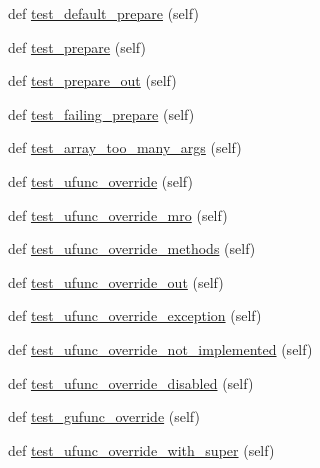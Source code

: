 \begin{DoxyCompactItemize}
\item 
def \hyperlink{classnumpy_1_1core_1_1tests_1_1test__umath_1_1TestSpecialMethods_a8b944828c84650e9819dfaca50b39421}{test\+\_\+default\+\_\+prepare} (self)
\item 
def \hyperlink{classnumpy_1_1core_1_1tests_1_1test__umath_1_1TestSpecialMethods_a16544636ec1f420199e69ce07de07327}{test\+\_\+prepare} (self)
\item 
def \hyperlink{classnumpy_1_1core_1_1tests_1_1test__umath_1_1TestSpecialMethods_aacd7f130bc69e71d610eee6029c538d4}{test\+\_\+prepare\+\_\+out} (self)
\item 
def \hyperlink{classnumpy_1_1core_1_1tests_1_1test__umath_1_1TestSpecialMethods_ab8a0e8ab5e5d173549761bc0f0c7fadc}{test\+\_\+failing\+\_\+prepare} (self)
\item 
def \hyperlink{classnumpy_1_1core_1_1tests_1_1test__umath_1_1TestSpecialMethods_a57c2f4d5cb30f2186ed48e1dc10c3b4b}{test\+\_\+array\+\_\+too\+\_\+many\+\_\+args} (self)
\item 
def \hyperlink{classnumpy_1_1core_1_1tests_1_1test__umath_1_1TestSpecialMethods_ae6b6e10fb5742dfea8b23ba4153b23ab}{test\+\_\+ufunc\+\_\+override} (self)
\item 
def \hyperlink{classnumpy_1_1core_1_1tests_1_1test__umath_1_1TestSpecialMethods_ab11ce6db82d9d7f374963b00e3accc34}{test\+\_\+ufunc\+\_\+override\+\_\+mro} (self)
\item 
def \hyperlink{classnumpy_1_1core_1_1tests_1_1test__umath_1_1TestSpecialMethods_abafb86b895d9477a02a8fc184c4aeb04}{test\+\_\+ufunc\+\_\+override\+\_\+methods} (self)
\item 
def \hyperlink{classnumpy_1_1core_1_1tests_1_1test__umath_1_1TestSpecialMethods_a28702be65101aff63f5eed8dd007246b}{test\+\_\+ufunc\+\_\+override\+\_\+out} (self)
\item 
def \hyperlink{classnumpy_1_1core_1_1tests_1_1test__umath_1_1TestSpecialMethods_a0139894985d9ed456900a9d14677d052}{test\+\_\+ufunc\+\_\+override\+\_\+exception} (self)
\item 
def \hyperlink{classnumpy_1_1core_1_1tests_1_1test__umath_1_1TestSpecialMethods_a2724f4d873ca426c805b25941e751175}{test\+\_\+ufunc\+\_\+override\+\_\+not\+\_\+implemented} (self)
\item 
def \hyperlink{classnumpy_1_1core_1_1tests_1_1test__umath_1_1TestSpecialMethods_a42392f4d161d057e0fec937465ed149d}{test\+\_\+ufunc\+\_\+override\+\_\+disabled} (self)
\item 
def \hyperlink{classnumpy_1_1core_1_1tests_1_1test__umath_1_1TestSpecialMethods_a2aff7ce90fd001ef4eca86fc7b902789}{test\+\_\+gufunc\+\_\+override} (self)
\item 
def \hyperlink{classnumpy_1_1core_1_1tests_1_1test__umath_1_1TestSpecialMethods_a56da55af906cddc7cfaf4b20400d09fa}{test\+\_\+ufunc\+\_\+override\+\_\+with\+\_\+super} (self)
\end{DoxyCompactItemize}
